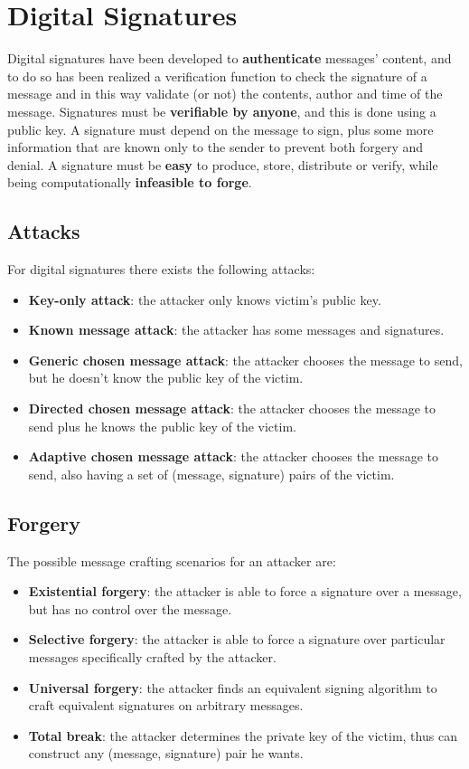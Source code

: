 \documentclass[oneside]{academica}
\begin{document}
\chapter{Digital Signatures}

Digital signatures have been developed to \textbf{authenticate} messages' content, and to do so has been realized a verification function to check the signature of a message and in this way validate (or not) the contents, author and time of the message.
Signatures must be \textbf{verifiable by anyone}, and this is done using a public key.
A signature must depend on the message to sign, plus some more information that are known only to the sender to prevent both forgery and denial.
A signature must be \textbf{easy} to produce, store, distribute or verify, while being computationally \textbf{infeasible to forge}.

\section{Attacks}

For digital signatures there exists the following attacks:
\begin{itemize}
  \item \textbf{Key-only attack}: the attacker only knows victim's public key.
  \item \textbf{Known message attack}: the attacker has some messages and signatures.
  \item \textbf{Generic chosen message attack}: the attacker chooses the message to send, but he doesn't know the public key of the victim.
  \item \textbf{Directed chosen message attack}: the attacker chooses the message to send plus he knows the public key of the victim.
  \item \textbf{Adaptive chosen message attack}: the attacker chooses the message to send, also having a set of (message, signature) pairs of the victim.
\end{itemize}

\section{Forgery}

The possible message crafting scenarios for an attacker are:
\begin{itemize}
  \item \textbf{Existential forgery}: the attacker is able to force a signature over a message, but has no control over the message.
  \item \textbf{Selective forgery}: the attacker is able to force a signature over particular messages specifically crafted by the attacker.
  \item \textbf{Universal forgery}: the attacker finds an equivalent signing algorithm to craft equivalent signatures on arbitrary messages.
  \item \textbf{Total break}: the attacker determines the private key of the victim, thus can construct any (message, signature) pair he wants.
\end{itemize}
\end{document}
